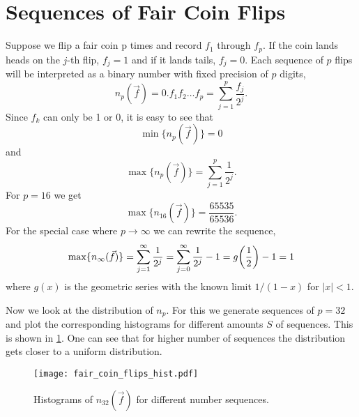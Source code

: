\section{Sequences of Fair Coin Flips}\label{sec:1}
Suppose we flip a fair coin p times and record $f_1$ through $f_p$. 
If the coin lands heads on the $j$-th flip,  $f_j = 1$
and if it lands tails, $f_j=0$. Each sequence of $p$ flips will be interpreted 
as a binary number with fixed precision of $p$ digits, 
\begin{equation}
    n_p(\vec f) = 0.f_1f_2\dots f_p = \sum_{j=1}^p \frac{f_j}{2^j}.
    \label{fig:coinflip_sequence}
\end{equation}
Since $f_k$ can only be 1 or 0, it is easy to see that 
$$\min\{n_p(\vec f)\} = 0$$
and 
$$\max\{n_p(\vec f)\} = \sum_{j=1}^p \frac{1}{2^j}.$$
For $p=16$ we get 
\[
    \max\{n_{16}(\vec f)\} = \frac{\num{65535}}{\num{65536}}.
\]
For the special case where $p\rightarrow\infty$ we can rewrite the sequence,
\[
    \max\{n_\infty(\vec f)\} = \sum_{j=1}^\infty \frac{1}{2^j}
    = \sum_{j=0}^\infty \frac{1}{2^j} - 1 = g\qty(\frac{1}{2}) - 1 = 1
\]
where $g(x)$ is the geometric series with the known limit $1 / (1 - x)$ for $|x| < 1$.\par 
Now we look at the distribution of $n_p$. For this we generate sequences 
of $p=32$ and plot the corresponding histograms for different amounts $S$ of sequences.
This is shown in \cref{fig:coin_flip_hist}. One can see that for 
higher number of sequences the distribution gets closer to a uniform distribution.

\begin{figure}[htb]
    \centering
    \texttt{[image: fair\_coin\_flips\_hist.pdf]}
    \caption{Histograms of $n_{32}(\vec f)$ for different number sequences.}
    \label{fig:coin_flip_hist}
\end{figure}
